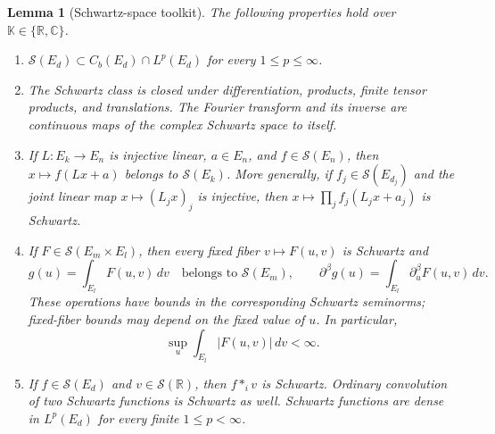 \documentclass[12pt,reqno]{amsart}
\theoremstyle{plain}
\newtheorem{lemma}[theorem]{Lemma}
\theoremstyle{definition}
\theoremstyle{remark}
\numberwithin{equation}{section}
\newcommand{\R}{\mathbb R}
\newcommand{\C}{\mathbb C}
\newcommand{\Sp}{\mathcal S}
\newcommand{\dd}{\,d}
\begin{document}
\begin{lemma}[Schwartz-space toolkit]\label{lem:schwartz}
The following properties hold over $\mathbb K\in\{\R,\C\}$.
\begin{enumerate}
\item $\Sp(E_d)\subset C_b(E_d)\cap L^p(E_d)$
for every $1\le p\le\infty$.
\item The Schwartz class is closed under differentiation, products,
finite tensor products, and translations. The Fourier transform and
its inverse are continuous maps of the complex Schwartz space to itself.
\item If $L:E_k\to E_n$ is injective linear, $a\in E_n$, and
$f\in\Sp(E_n)$, then $x\mapsto f(Lx+a)$ belongs to $\Sp(E_k)$.
More generally, if $f_j\in\Sp(E_{d_j})$ and the joint linear map
$x\mapsto(L_jx)_j$ is injective, then
$x\mapsto\prod_j f_j(L_jx+a_j)$ is Schwartz.
\item If $F\in\Sp(E_m\times E_l)$, then every fixed fiber
$v\mapsto F(u,v)$ is Schwartz and
\[
 g(u)=\int_{E_l}F(u,v)\dd v
 \quad\text{belongs to }\Sp(E_m),\qquad
 \partial^\beta g(u)=\int_{E_l}\partial_u^\beta F(u,v)\dd v.
\]
These operations have bounds in the corresponding Schwartz seminorms;
fixed-fiber bounds may depend on the fixed value of $u$.
In particular,
\[
 \sup_u\int_{E_l}|F(u,v)|\dd v<\infty.
\]
\item If $f\in\Sp(E_d)$ and $v\in\Sp(\R)$, then $f*_i v$
is Schwartz. Ordinary convolution of two Schwartz functions is
Schwartz as well. Schwartz functions are dense in $L^p(E_d)$ for
every finite $1\le p<\infty$.
\end{enumerate}
\end{lemma}
\end{document}
